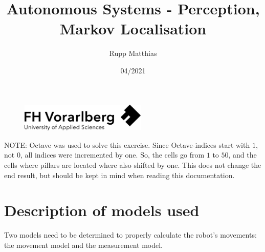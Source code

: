 \documentclass[11pt]{article}
\begin{document}
    \title{Autonomous Systems - Perception, Markov Localisation}
    \date{04/2021}
    \author{Rupp Matthias}
    \maketitle
    \thispagestyle{empty}
    \vspace{2 cm}
    \begin{figure}[H]
        \centering
        \includegraphics[width = 6cm]{Logo-A3}\label{fig:logo}
    \end{figure}
    \pagebreak

    \tableofcontents
    \thispagestyle{empty}
    \clearpage


    \lstset{style=mystyle}

    NOTE: Octave was used to solve this exercise.
    Since Octave-indices start with $1$, not $0$, all indices were incremented by one.
    So, the cells go from $1$ to $50$, and the cells where pillars are located where also shifted by one.
    This does not change the end result, but should be kept in mind when reading this documentation.

    \section{Description of models used}\label{sec:models}
    Two models need to be determined to properly calculate the robot's movements: the movement model and the measurement model.
\end{document}
